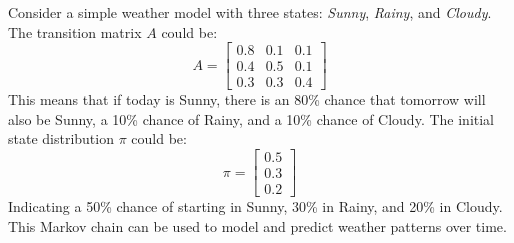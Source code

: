 \begin{examplebox}
    Consider a simple weather model with three states: \emph{Sunny}, \emph{Rainy}, and \emph{Cloudy}. The transition matrix $A$ could be:
    \begin{equation*}
        A = \begin{bmatrix}
            0.8 & 0.1 & 0.1 \\
            0.4 & 0.5 & 0.1 \\
            0.3 & 0.3 & 0.4
        \end{bmatrix}
    \end{equation*}
    This means that if today is Sunny, there is an 80\% chance that tomorrow will also be Sunny, a 10\% chance of Rainy, and a 10\% chance of Cloudy. The initial state distribution $\pi$ could be:
    \begin{equation*}
        \pi = \begin{bmatrix}
            0.5 \\
            0.3 \\
            0.2
        \end{bmatrix}
    \end{equation*}
    Indicating a 50\% chance of starting in Sunny, 30\% in Rainy, and 20\% in Cloudy. This Markov chain can be used to model and predict weather patterns over time.
\end{examplebox}

